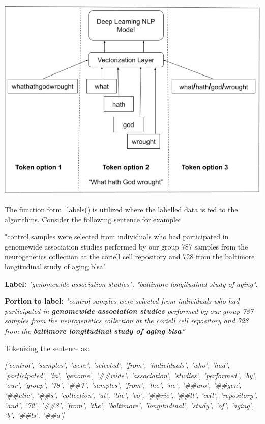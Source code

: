 \documentclass[twocolumn]{article}
\begin{document}
\begin{center}
\includegraphics[scale=0.3]{tokenizer.jpeg} 
\end{center}

The function form\_labels() is utilized where the labelled data is fed to the algorithms. Consider the following sentence for example: 

"control samples were selected from individuals who had participated in genomewide association studies performed by our group 787 samples from the neurogenetics collection at the coriell cell repository and 728 from the baltimore longitudinal study of aging blsa" \par

\textbf{Label:} \textit{"genomewide association studies", "baltimore longitudinal study of aging"}. \par

\textbf{Portion to label:} \textit{"control samples were selected from individuals who had participated in \textbf{genomewide association studies} performed by our group 787 samples from the neurogenetics collection at the coriell cell repository and 728 from the \textbf{baltimore longitudinal study of aging blsa"}} \par 

Tokenizing the sentence as: \par
\textit{['control', 'samples', 'were', 'selected', 'from', 'individuals', 'who', 'had', 'participated', 'in', 'genome', '\#\#wide', 'association', 'studies', 'performed', 'by', 'our', 'group', '78', '\#\#7', 'samples', 'from', 'the', 'ne', '\#\#uro', '\#\#gen', '\#\#etic', '\#\#s', 'collection', 'at', 'the', 'co', '\#\#rie', '\#\#ll', 'cell', 'repository', 'and', '72', '\#\#8', 'from', 'the', 'baltimore', 'longitudinal', 'study', 'of', 'aging', 'b', '\#\#ls', '\#\#a']} \par 
\end{document}
